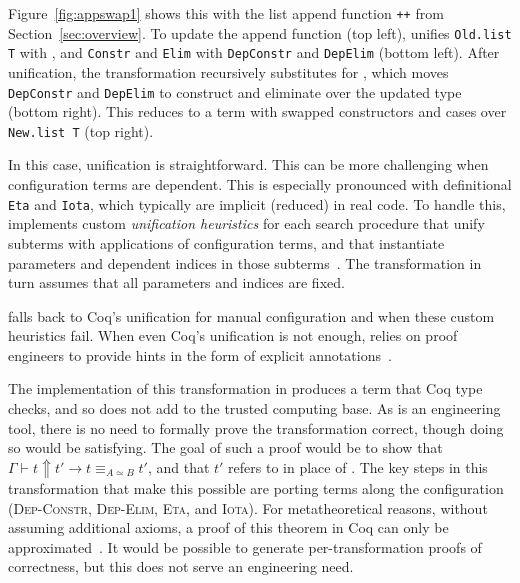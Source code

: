 Figure~\ref{fig:appswap1} shows this with the list append function \lstinline{++} from Section~\ref{sec:overview}.
To update the append function (top left), \toolname unifies \lstinline{Old.list T} with \A, and \lstinline{Constr} and \lstinline{Elim}
with \lstinline{DepConstr} and \lstinline{DepElim} (bottom left).
After unification, the transformation recursively substitutes \B
for \A, which moves \lstinline{DepConstr} and \lstinline{DepElim}
to construct and eliminate over the updated type (bottom right).
This reduces to a term with swapped constructors and cases over \lstinline{New.list T} (top right).

In this case, unification is straightforward. %
This can be more challenging when configuration terms are dependent.
This is especially pronounced with definitional \lstinline{Eta} and \lstinline{Iota},
which typically are implicit (reduced) in real code.
To handle this, \toolname implements custom \textit{unification heuristics} for each search procedure
that unify subterms with applications of configuration terms, and that instantiate parameters and dependent indices in those subterms~. %
The transformation in turn assumes that all parameters and indices are fixed.

\toolname falls back to Coq's unification for manual configuration and when these custom heuristics fail.
When even Coq's unification is not enough, \toolname relies on proof engineers to provide hints
in the form of explicit annotations~.

The implementation of this transformation in \toolname produces a term that Coq type checks, and so does not
add to the trusted computing base.
As \toolname is an engineering tool, there is no need to formally prove the transformation correct, though doing so would be satisfying.
The goal of such a proof would be to show that %
$\Gamma \vdash t \Uparrow t' \rightarrow t \equiv_{A \simeq B} t'$, and that $t'$ refers to \B in place of \A.
The key steps in this transformation that make this possible are porting terms along the configuration %
(\textsc{Dep-Constr}, \textsc{Dep-Elim}, \textsc{Eta}, and \textsc{Iota}).
For metatheoretical reasons, without assuming additional axioms, a proof of this theorem in Coq can only be approximated~\cite{tabareau2017equivalences}.
It would be possible to generate per-transformation proofs of correctness, but this does not serve an engineering need.

